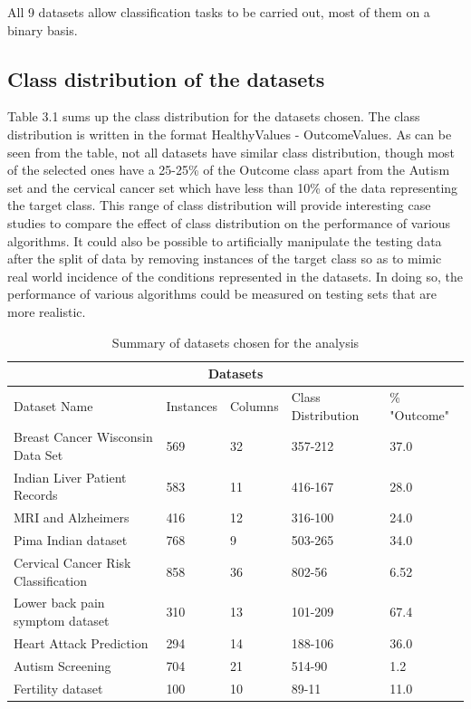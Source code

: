 All 9 datasets allow classification tasks to be carried out, most of them on a binary basis.

\subsection{Class distribution of the datasets}
Table 3.1 sums up the class distribution for the datasets chosen. The class distribution is written in the format HealthyValues - OutcomeValues.
As can be seen from the table, not all datasets have similar class distribution, though most of the selected ones have a 25-25\% of the Outcome class apart from the Autism set and the cervical cancer set which have less than 10\% of the data representing the target class. \newline This range of class distribution will provide interesting case studies to compare the effect of class distribution on the performance of various algorithms. It could also be possible to artificially manipulate the testing data after the split of data by removing instances of the target class so as to mimic real world incidence of the conditions represented in the datasets. In doing so, the performance of various algorithms could be measured on testing sets that are more realistic.

\begin{table}
\begin{tabular}{ |p{4cm}|p{1.5cm}| p{1.5cm} | p{1.5 cm}| p{0.9cm}|}
 \hline
 \multicolumn{5}{|c|}{Datasets} \\
 \hline
 Dataset Name & Instances & Columns & Class Distribution & \% "Outcome" \\
 \hline
 Breast Cancer Wisconsin Data Set& 569 & 32 & 
357-212 & 37.0\\
Indian Liver Patient Records&  583 & 11  & 416-167 & 28.0 \\
MRI and Alzheimers & 416 & 12 & 316-100 & 24.0 \\
Pima Indian dataset& 768 & 9  & 503-265 & 34.0 \\
Cervical Cancer Risk Classification & 858 &  36 & 802-56 & 6.52\\
Lower back pain symptom dataset & 310 & 13  & 101-209 & 67.4\\
Heart Attack Prediction & 294 & 14  & 188-106 & 36.0\\
Autism Screening&704 & 21 &514-90 & 1.2 \\
Fertility dataset&100  & 10 & 89-11 & 11.0\\
 \hline
\end{tabular}
\caption{Summary of datasets chosen for the analysis}
\label{table:1}
\end{table}



